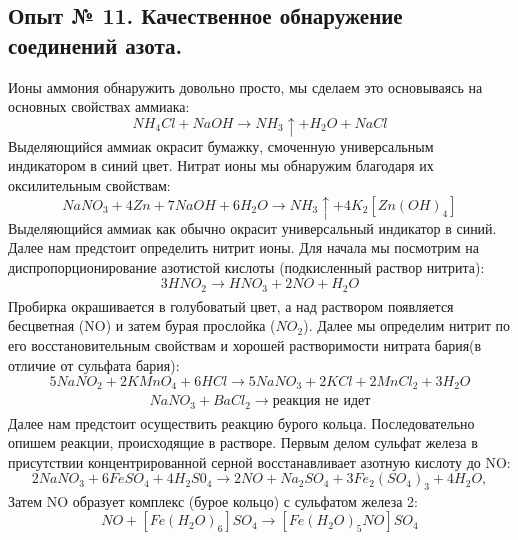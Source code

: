 \documentclass[a4paper,12pt]{article}
\begin{document}
\subsection{Опыт № 11. Качественное обнаружение соединений азота.}
Ионы аммония обнаружить довольно просто, мы сделаем это основываясь на основных свойствах аммиака:
\begin{equation}
    NH_4Cl + NaOH \xrightarrow[]{} NH_3\uparrow + H_2O + NaCl
\end{equation}
Выделяющийся аммиак окрасит бумажку, смоченную универсальным индикатором в синий цвет.\newline
Нитрат ионы мы обнаружим благодаря их оксилительным свойствам:
\begin{equation}
    NaNO_3 + 4Zn + 7NaOH + 6H_2O \xrightarrow[]{} NH_3\uparrow +4K_2[Zn(OH)_4]
\end{equation}
Выделяющийся аммиак как обычно окрасит универсальный индикатор в синий. \newline
Далее нам предстоит определить нитрит ионы. Для начала мы посмотрим на диспропорционирование азотистой кислоты (подкисленный раствор нитрита):
\begin{equation}
    3HNO_2 \xrightarrow[]{} HNO_3 + 2NO + H_2O
\end{equation}
Пробирка окрашивается в голубоватый цвет, а над раствором появляется бесцветная (NO) и затем бурая прослойка ($NO_2$).\newline
Далее мы определим нитрит по его восстановительным свойствам и хорошей растворимости нитрата бария(в отличие от сульфата бария):
\begin{equation}
    5NaNO_2 + 2KMnO_4 + 6HCl \xrightarrow[]{} 5NaNO_3 + 2KCl + 2MnCl_2 + 3H_2O
\end{equation}
\begin{equation}
    NaNO_3 + BaCl_2 \xrightarrow[]{} \text{реакция не идет}
\end{equation}
Далее нам предстоит осуществить реакцию бурого кольца. Последовательно опишем реакции, происходящие в растворе. Первым делом сульфат железа в присутствии концентрированной серной восстанавливает азотную кислоту до NO:
\begin{equation}
    2NaNO_3 + 6FeSO_4 + 4H_2S0_4 \xrightarrow[]{} 2NO  + Na_2SO_4 + 3Fe_2 (SO_4)_3 + 4H_2O,
\end{equation}
Затем NO образует комплекс (бурое кольцо) с сульфатом железа 2:
\begin{equation}
    NO + [Fe(H_2O)_6]SO_4 \xrightarrow[]{} [Fe(H_2O)_5NO]SO_4
\end{equation}
\end{document}
